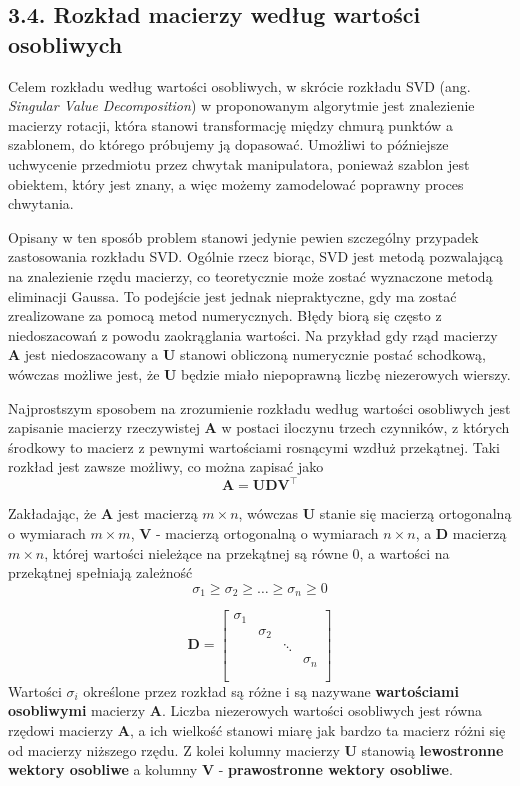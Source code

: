 \documentclass{article}
\begin{document}
\subsection*{\LARGE{3.4. Rozkład macierzy według wartości osobliwych}} 

Celem rozkładu według wartości osobliwych, w skrócie rozkładu SVD (ang. \emph{Singular Value Decomposition}) w proponowanym algorytmie jest znalezienie macierzy rotacji, która stanowi transformację między chmurą punktów a szablonem, do którego próbujemy ją dopasować. Umożliwi to późniejsze uchwycenie przedmiotu przez chwytak manipulatora, ponieważ szablon jest obiektem, który jest znany, a więc możemy zamodelować poprawny proces chwytania.

Opisany w ten sposób problem stanowi jedynie pewien szczególny przypadek zastosowania rozkładu SVD. Ogólnie rzecz biorąc, SVD jest metodą pozwalającą na znalezienie rzędu macierzy, co teoretycznie może zostać wyznaczone metodą eliminacji Gaussa. To podejście jest jednak niepraktyczne, gdy ma zostać zrealizowane za pomocą metod numerycznych. Błędy biorą się często z niedoszacowań z powodu zaokrąglania wartości. Na przykład gdy rząd macierzy $\mathbf{A}$ jest niedoszacowany a $\mathbf{U}$ stanowi obliczoną numerycznie postać schodkową, wówczas możliwe jest, że $\mathbf{U}$ będzie miało niepoprawną liczbę niezerowych wierszy.

Najprostszym sposobem na zrozumienie rozkładu według wartości osobliwych jest zapisanie macierzy rzeczywistej $\mathbf{A}$ w postaci iloczynu trzech czynników, z których środkowy to macierz z pewnymi wartościami rosnącymi wzdłuż przekątnej. Taki rozkład jest zawsze możliwy, co można zapisać jako
\[\mathbf{A = UDV^\top} \]

Zakładając, że $\mathbf{A}$ jest macierzą $m \times n$, wówczas $\mathbf{U}$ stanie się macierzą ortogonalną o wymiarach $m \times m$, $\mathbf{V}$ - macierzą ortogonalną o wymiarach $n \times n$, a $\mathbf{D}$ macierzą $m \times n$, której wartości nieleżące na przekątnej są równe 0, a wartości na przekątnej spełniają zależność
\[\sigma_1 \geq \sigma_2 \geq \ldots \geq \sigma_n \geq 0\]

\[
\mathbf{D} = \begin{bmatrix}
\sigma_1 & & & \\
& \sigma_2 & & \\
& & \ddots & \\
& & & \sigma_n \\\\
\end{bmatrix}
\]
Wartości $\sigma_i$ określone przez rozkład są różne i są nazywane \textbf{wartościami osobliwymi} macierzy $\mathbf{A}$. Liczba niezerowych wartości osobliwych jest równa rzędowi macierzy $\mathbf{A}$, a ich wielkość stanowi miarę jak bardzo ta macierz różni się od macierzy niższego rzędu. Z kolei kolumny macierzy $\mathbf{U}$ stanowią \textbf{lewostronne wektory osobliwe} a kolumny $\mathbf{V}$ - \textbf{prawostronne wektory osobliwe}.
\end{document}
